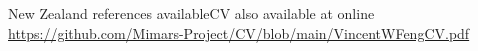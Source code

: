 

\begin{cventries}

  \cventry
    {}{New Zealand references available}{}{}{CV also available at online \url{https://github.com/Mimars-Project/CV/blob/main/VincentWFengCV.pdf}}


\end{cventries}
